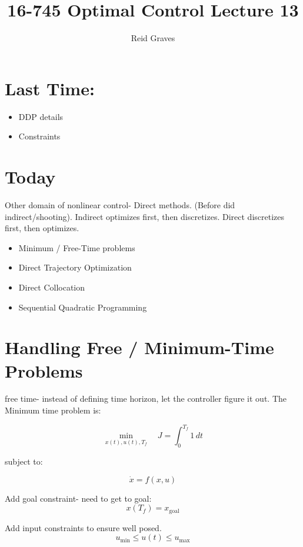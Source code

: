 \documentclass[11pt]{article}
\title{16-745 Optimal Control Lecture 13}
\author{Reid Graves}
\begin{document}
\maketitle

\section*{Last Time:}
\begin{itemize}
    \item DDP details
    \item Constraints
\end{itemize}

\section*{Today} 
Other domain of nonlinear control- Direct methods. (Before did indirect/shooting). Indirect optimizes first, then discretizes. Direct discretizes first, then optimizes.
\begin{itemize}
    \item Minimum / Free-Time problems
    \item Direct Trajectory Optimization
    \item Direct Collocation
    \item Sequential Quadratic Programming
\end{itemize}

\section*{Handling Free / Minimum-Time Problems}

free time- instead of defining time horizon, let the controller figure it out. The Minimum time problem is:

\begin{equation*}
    \min_{x(t), u(t), T_f} \quad J = \int_0^{T_f} 1 \, dt
\end{equation*}

subject to:

\begin{equation*}
    \dot{x} = f(x, u)
\end{equation*}

Add goal constraint- need to get to goal:
\begin{equation*}
    x(T_f) = x_{\text{goal}}
\end{equation*}

Add input constraints to ensure well posed.
\begin{equation*}
    u_{\min} \leq u(t) \leq u_{\max}
\end{equation*}
\end{document}
